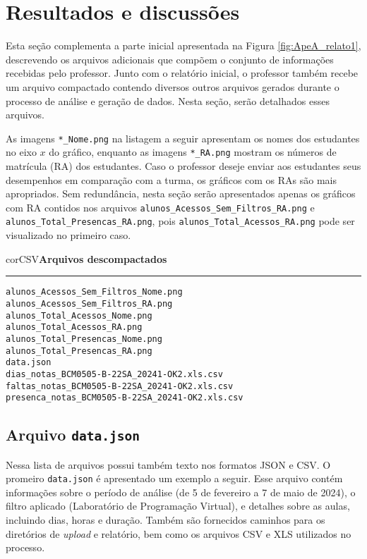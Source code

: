 \section{Resultados e discussões}\label{sec:apendice_resultados}

Esta seção complementa a parte inicial apresentada na Figura \ref{fig:ApeA_relato1}, descrevendo os arquivos adicionais que compõem o conjunto de informações recebidas pelo professor. Junto com o relatório inicial, o professor também recebe um arquivo compactado contendo diversos outros arquivos gerados durante o processo de análise e geração de dados. Nesta seção, serão detalhados esses arquivos.

As imagens \verb|*_Nome.png| na listagem a seguir apresentam os nomes dos estudantes no eixo $x$ do gráfico, enquanto as imagens \verb|*_RA.png| mostram os números de matrícula (RA) dos estudantes. Caso o professor deseje enviar aos estudantes seus desempenhos em comparação com a turma, os gráficos com os RAs são mais apropriados. Sem redundância, nesta seção serão apresentados apenas os gráficos com RA contidos nos arquivos \verb|alunos_Acessos_Sem_Filtros_RA.png| e \verb|alunos_Total_Presencas_RA.png|, pois \verb|alunos_Total_Acessos_RA.png| pode ser visualizado no primeiro caso.
\
\begin{myboxCode}{corCSV}{\textbf{Arquivos descompactados}}\vspace{3mm}
\hrule
\begin{verbatim}
alunos_Acessos_Sem_Filtros_Nome.png
alunos_Acessos_Sem_Filtros_RA.png
alunos_Total_Acessos_Nome.png
alunos_Total_Acessos_RA.png
alunos_Total_Presencas_Nome.png
alunos_Total_Presencas_RA.png
data.json
dias_notas_BCM0505-B-22SA_20241-OK2.xls.csv
faltas_notas_BCM0505-B-22SA_20241-OK2.xls.csv
presenca_notas_BCM0505-B-22SA_20241-OK2.xls.csv
\end{verbatim}
\end{myboxCode}


\subsection{Arquivo \texttt{data.json}}

Nessa lista de arquivos possui também texto nos formatos JSON e CSV. O promeiro \verb|data.json| é apresentado um exemplo a seguir. Esse arquivo contém informações sobre o período de análise (de 5 de fevereiro a 7 de maio de 2024), o filtro aplicado (Laboratório de Programação Virtual), e detalhes sobre as aulas, incluindo dias, horas e duração. Também são fornecidos caminhos para os diretórios de \textit{upload} e relatório, bem como os arquivos CSV e XLS utilizados no processo.



